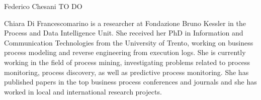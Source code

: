 \documentclass[10pt,journal,compsoc]{IEEEtran}
\theoremstyle{definition}
\theoremstyle{plain}
\begin{document}


%




%











\begin{IEEEbiography}{Federico Chesani}
TO DO
\end{IEEEbiography}

\begin{IEEEbiography}{Chiara Di Francescomarino}
is a researcher at Fondazione Bruno Kessler in the Process and Data Intelligence  Unit.  She received her PhD in Information and Communication Technologies from the University of Trento, working on business process modeling and reverse engineering from execution logs. She is currently working in the field of process mining, investigating problems related to process monitoring, process discovery, as well as predictive process monitoring. She has published papers in the top business process conferences and journals and she has worked in local and international research projects. 
\end{IEEEbiography}
\end{document}
